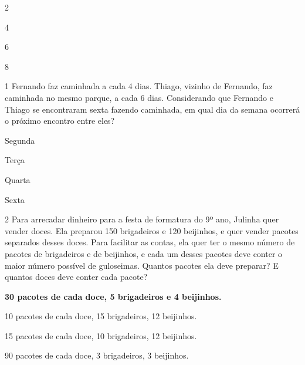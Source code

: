 \begin{escolha}
\begin{escolha}
\item 2
\item 4
\item 6
\item 8
\end{escolha}



\num{1} Fernando faz caminhada a cada 4 dias. Thiago, vizinho de
Fernando, faz caminhada no mesmo parque, a cada 6 dias. Considerando que
Fernando e Thiago se encontraram sexta fazendo caminhada, em qual dia da
semana ocorrerá o próximo encontro entre eles?

\begin{escolha}
\item Segunda
\item Terça
\item Quarta
\item Sexta
\end{escolha}


\num{2} Para arrecadar dinheiro para a festa de formatura do 9º ano,
Julinha quer vender doces. Ela preparou 150 brigadeiros e 120 beijinhos,
e quer vender pacotes separados desses doces. Para facilitar as contas,
ela quer ter o mesmo número de pacotes de brigadeiros e de beijinhos, e
cada um desses pacotes deve conter o maior número possível de guloseimas. 
Quantos pacotes ela deve preparar? E quantos doces deve conter cada 
pacote?   

\begin{escolha}
\item
  \textbf{30 pacotes de cada doce, 5 brigadeiros e 4 beijinhos.}
\item
  10 pacotes de cada doce, 15 brigadeiros, 12 beijinhos.
\item
  15 pacotes de cada doce, 10 brigadeiros, 12 beijinhos.
\item
  90 pacotes de cada doce, 3 brigadeiros, 3 beijinhos.
\end{escolha}


\end{escolha}
